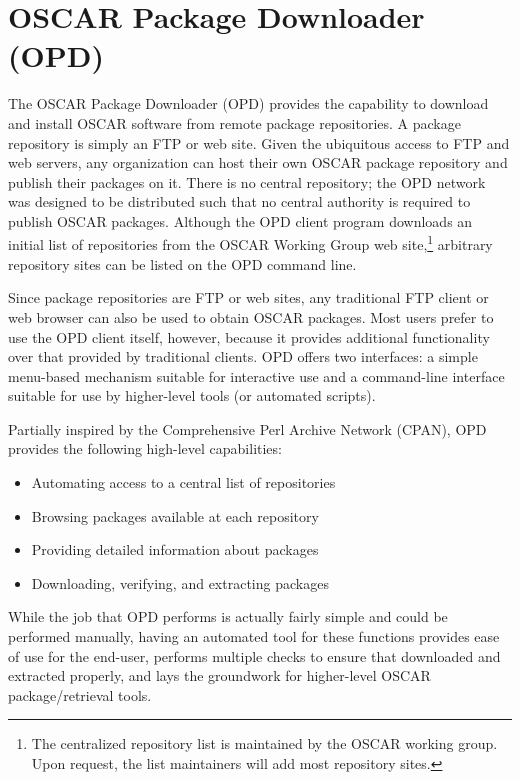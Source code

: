 %
%
%
%


\section{OSCAR Package Downloader (OPD)}
\label{sect:opd}

The OSCAR Package Downloader (OPD) provides the capability to download
and install OSCAR software from remote package repositories.  A
package repository is simply an FTP or web site.  Given the ubiquitous
access to FTP and web servers, any organization can host their own
OSCAR package repository and publish their packages on it.  There is
no central repository; the OPD network was designed to be distributed
such that no central authority is required to publish OSCAR packages.
%
Although the OPD client program downloads an initial list of
repositories from the OSCAR Working Group web site,\footnote{The
  centralized repository list is maintained by the OSCAR working
  group.  Upon request, the list maintainers will add most repository
  sites.} arbitrary repository sites can be listed on the OPD command
line.

Since package repositories are FTP or web sites, any traditional FTP
client or web browser can also be used to obtain OSCAR packages.  Most
users prefer to use the OPD client itself, however, because it
provides additional functionality over that provided by traditional
clients.  OPD offers two interfaces: a simple menu-based mechanism
suitable for interactive use and a command-line interface suitable for
use by higher-level tools (or automated scripts).

Partially inspired by the Comprehensive Perl Archive Network (CPAN),
OPD provides the following high-level capabilities:
%
\begin{itemize}
\item Automating access to a central list of repositories
\item Browsing packages available at each repository
\item Providing detailed information about packages
\item Downloading, verifying, and extracting packages
\end{itemize}
%
While the job that OPD performs is actually fairly simple and could be
performed manually, having an automated tool for these functions
provides ease of use for the end-user, performs multiple checks to
ensure that downloaded and extracted properly, and lays the groundwork
for higher-level OSCAR package/retrieval tools.
